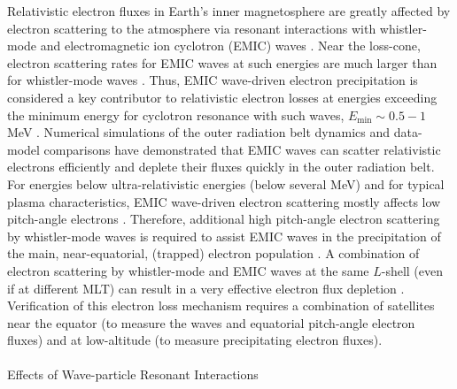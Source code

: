 \documentclass[
  letterpaper,
  DIV=11,
  numbers=noendperiod]{scrartcl}
\makeatletter
\let\oldparagraph\paragraph
\renewcommand{\paragraph}{
    \@ifstar
      \xxxParagraphStar
      \xxxParagraphNoStar
  }
\newcommand{\xxxParagraphStar}[1]{\oldparagraph*{#1}\mbox{}}
\newcommand{\xxxParagraphNoStar}[1]{\oldparagraph{#1}\mbox{}}
\makeatother
\begin{document}
Relativistic electron fluxes in Earth's inner magnetosphere are greatly affected by electron scattering to the atmosphere via resonant interactions with whistler-mode and electromagnetic ion cyclotron (EMIC) waves \citep{millanReviewRadiationBelt2007, summersTimescalesRadiationBelt2007a}. Near the loss-cone, electron scattering rates for EMIC waves at such energies are much larger than for whistler-mode waves \citep{glauertCalculationPitchAngle2005}. Thus, EMIC wave-driven electron precipitation is considered a key contributor to relativistic electron losses at energies exceeding the minimum energy for cyclotron resonance with such waves, \(E_{\min}\sim 0.5-1\) MeV \citep{summersRelativisticElectronPitchangle2003, summersTimescalesRadiationBelt2007}. Numerical simulations of the outer radiation belt dynamics \citep{maModelingInwardDiffusion2015} and data-model comparisons \citep{angelopoulosEnergeticElectronPrecipitation2023} have demonstrated that EMIC waves can scatter relativistic electrons efficiently and deplete their fluxes quickly in the outer radiation belt.
For energies below ultra-relativistic energies (below several MeV) and for typical plasma characteristics, EMIC wave-driven electron scattering mostly affects low pitch-angle electrons \citep[equatorial \(\alpha_{eq}<30^\circ\), see][]{kerstenElectronLossesRadiation2014}. Therefore, additional high pitch-angle electron scattering by whistler-mode waves is required to assist EMIC waves in the precipitation of the main, near-equatorial, (trapped) electron population \citep{mourenasFastDropoutsMultiMeV2016}. A combination of electron scattering by whistler-mode and EMIC waves at the same \(L\)-shell (even if at different MLT) can result in a very effective electron flux depletion \citep{mourenasFastDropoutsMultiMeV2016, drozdovDepletionsMultiMeVElectrons2022}. Verification of this electron loss mechanism requires a combination of satellites near the equator (to measure the waves and equatorial pitch-angle electron fluxes) and at low-altitude (to measure precipitating electron fluxes).

\paragraph{Effects of Wave-particle Resonant Interactions}\label{effects-of-wave-particle-resonant-interactions}
\end{document}
